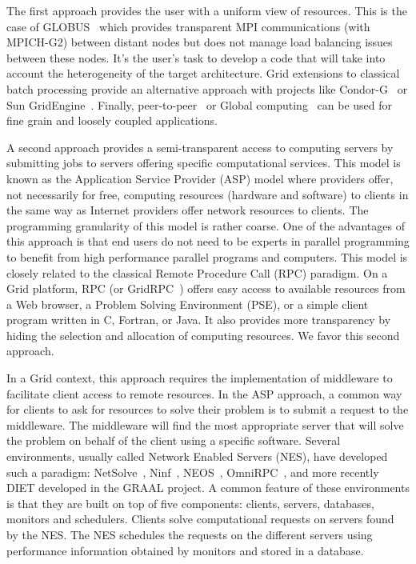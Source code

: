 \documentclass[12pt,a4paper]{book}
\begin{document}
The first approach provides the user with a uniform view of
resources. This is the case of GLOBUS~\cite{Globus} which provides
transparent MPI communications (with MPICH-G2) between distant nodes
but does not manage load balancing issues between these nodes. It's
the user's task to develop a code that will take into account the
heterogeneity of the target architecture. Grid extensions to
classical batch processing provide an alternative approach with
projects like Condor-G~\cite{Condor} or Sun
GridEngine~\cite{SunGridEngine}. Finally, peer-to-peer~\cite{Oram01}
or Global computing~\cite{germain01global} can be used for fine
grain and loosely coupled applications.

A second approach provides a semi-transparent access to computing
servers by submitting jobs to servers offering specific
computational services. This model is known
as the Application Service Provider (ASP) model where providers offer,
not necessarily for free, computing resources (hardware and software)
to clients in the same way as Internet providers offer network
resources to clients. The programming granularity of this model is
rather coarse. One of the advantages of this approach is that end
users do not need to be experts in parallel programming to benefit
from high performance parallel programs and computers. This model is
closely related to the classical Remote Procedure Call (RPC)
paradigm. On a Grid platform, RPC (or
GridRPC~\cite{MNS+00,NMSDLC02}) offers easy access to available
resources from a Web browser, a Problem Solving Environment (PSE), or a
simple client program written in C, Fortran, or Java.  It also
provides more transparency by hiding the selection and allocation of
computing resources. We favor this second approach.

In a Grid context, this approach requires the implementation of
middleware to facilitate client access to remote resources. In
the ASP approach, a common way for clients to ask for resources to
solve their problem is to submit a request to the middleware. The
middleware will find the most appropriate server that will solve the
problem on behalf of the client using a specific software. Several
environments, usually called Network Enabled Servers (NES), have
developed such a paradigm: NetSolve~\cite{nug}, Ninf~\cite{NSS99},
NEOS~\cite{FMM00}, OmniRPC~\cite{SHTS01}, and more recently DIET
developed in the GRAAL project. A common feature of these environments
is that they are built on top of five components: clients, servers,
databases, monitors and schedulers. Clients solve computational
requests on servers found by the NES. The NES schedules the requests
on the different servers using performance information obtained by
monitors and stored in a database.
\end{document}

